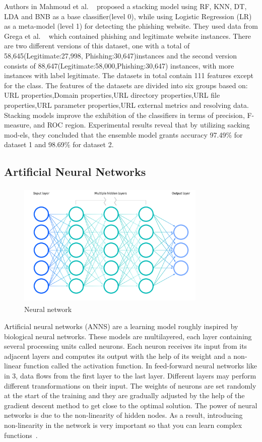 \documentclass[final]{cvpr}
\begin{document}
Authors in Mahmoud et al. ~\cite{othman2021empirical} proposed a stacking model using RF, KNN, DT, LDA and BNB as a base classifier(level 0), while using Logistic Regression (LR) as a meta-model (level 1) for detecting the phishing website. They used data from Grega et al. ~\cite{grega2020datasets} which contained phishing and legitimate website
instances. There are two different versions of this dataset, one with a total of 58,645(Legitimate:27,998, Phishing:30,647)instances and the second version consists of 88,647(Legitimate:58,000,Phishing:30,647) instances, with more instances with label legitimate. The datasets in total contain 111 features except for the class. The features of the datasets are divided into six groups based on: URL properties,Domain properties,URL directory properties,URL file properties,URL parameter properties,URL external metrics and resolving data. Stacking models improve the exhibition of the classifiers in terms of precision, F-measure, and ROC region.
Experimental results reveal that by utilizing sacking mod-els, they concluded that the ensemble model grants accuracy 97.49\% for dataset 1 and 98.69\% for dataset 2. 



\subsection{Artificial Neural Networks}

\hspace*{-0.9in}
\begin{figure}[h]
   \centering
   \includegraphics[width=9cm, height=6cm]{neural-network.png}
   \caption{Neural network}
   \label{fig:neural-network}
\end{figure}

Artificial neural networks (ANNS) are a learning model
roughly inspired by biological neural networks. These models
are multilayered, each layer containing several processing
units called neurons. Each neuron receives its input from
its adjacent layers and computes its output with the help
of its weight and a non-linear function called the activation
function. In feed-forward neural networks like in 3, data flows
from the first layer to the last layer. Different layers may
perform different transformations on their input. The weights
of neurons are set randomly at the start of the training and
they are gradually adjusted by the help of the gradient descent
method to get close to the optimal solution. The power of
neural networks is due to the non-linearity of hidden nodes.
As a result, introducing non-linearity in the network is very
important so that you can learn complex functions~\cite{Authors07}.
\end{document}
